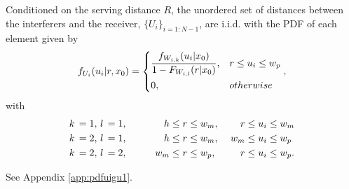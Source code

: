 \documentclass[journal,draftclsnofoot,onecolumn,12pt]{IEEEtran}
\begin{document}
\begin{lemma}\label{lem:pdfuigu1}
Conditioned on the serving distance $R$, the unordered set of distances between the interferers and the receiver, $\{U_i\}_{i=1:N-1}$, are i.i.d. with the PDF of each element given by
\begin{align}
f_{U_i}(u_i | r, x_0) = 
\begin{dcases}
\frac{f_{W_{i,k}}(u_i|x_0)}{1-F_{W_{i,l}}(r|x_0)}, & r \leq u_i \leq w_p \\
0,   & otherwise
\end{dcases},
\end{align}
with
\begin{alignat*}{4}\notag
k\, = 1, \, l\, = 1,&& \qquad  h &\leq r \leq w_m,\  &r &\leq  u_i \leq w_m \\ \notag
k\, = 2, \, l\, = 1,&& \qquad  h &\leq r \leq w_m,\ &w_m &\leq  u_i \leq w_p \\ \notag
k\, = 2, \, l\, = 2,&& \qquad  w_m &\leq r \leq w_p,\  &r &\leq  u_i \leq w_p .
\end{alignat*}
\end{lemma}
\begin{IEEEproof}
See Appendix \ref{app:pdfuigu1}.
\end{IEEEproof}
\end{document}
